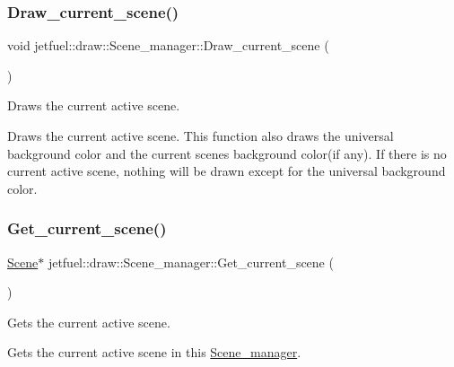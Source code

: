 \subsubsection{\texorpdfstring{Draw\+\_\+current\+\_\+scene()}{Draw\_current\_scene()}}
{\footnotesize\ttfamily void jetfuel\+::draw\+::\+Scene\+\_\+manager\+::\+Draw\+\_\+current\+\_\+scene (\begin{DoxyParamCaption}{ }\end{DoxyParamCaption})}



Draws the current active scene. 

Draws the current active scene. This function also draws the universal background color and the current scene\textquotesingle{}s background color(if any). If there is no current active scene, nothing will be drawn except for the universal background color. \mbox{\label{classjetfuel_1_1draw_1_1Scene__manager_aee85c52970c33205355ee0b6086373ba}} 
\subsubsection{\texorpdfstring{Get\+\_\+current\+\_\+scene()}{Get\_current\_scene()}}
{\footnotesize\ttfamily \hyperlink{classjetfuel_1_1draw_1_1Scene}{Scene}$\ast$ jetfuel\+::draw\+::\+Scene\+\_\+manager\+::\+Get\+\_\+current\+\_\+scene (\begin{DoxyParamCaption}{ }\end{DoxyParamCaption})\hspace{0.3cm}{\ttfamily [inline]}}



Gets the current active scene. 

Gets the current active scene in this \hyperlink{classjetfuel_1_1draw_1_1Scene__manager}{Scene\+\_\+manager}. \mbox{\label{classjetfuel_1_1draw_1_1Scene__manager_af8356086304df2aff630e09f07d57ca7}} 

